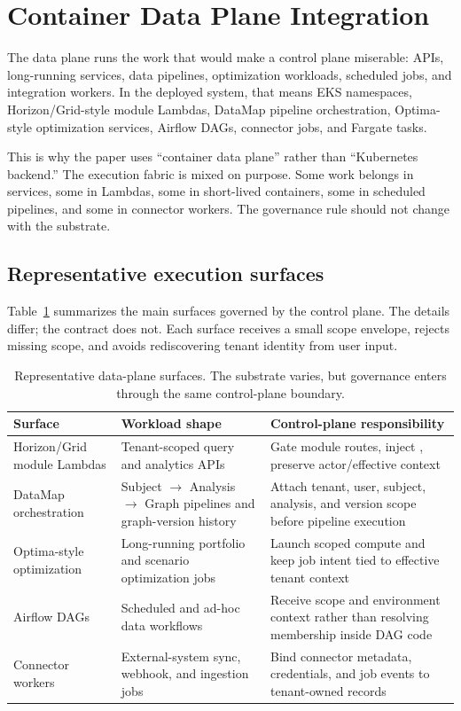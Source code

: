 \section{Container Data Plane Integration}
\label{sec:data-plane}

The data plane runs the work that would make a control plane miserable: APIs, long-running services, data pipelines, optimization workloads, scheduled jobs, and integration workers. In the deployed system, that means EKS namespaces, Horizon/Grid-style module Lambdas, DataMap pipeline orchestration, Optima-style optimization services, Airflow DAGs, connector jobs, and Fargate tasks.

This is why the paper uses ``container data plane'' rather than ``Kubernetes backend.'' The execution fabric is mixed on purpose. Some work belongs in services, some in Lambdas, some in short-lived containers, some in scheduled pipelines, and some in connector workers. The governance rule should not change with the substrate.

\subsection{Representative execution surfaces}

Table~\ref{tab:execution_surfaces} summarizes the main surfaces governed by the control plane. The details differ; the contract does not. Each surface receives a small scope envelope, rejects missing scope, and avoids rediscovering tenant identity from user input.

\begin{table}[H]
  \centering
  \scriptsize
  \begin{tabularx}{0.94\textwidth}{p{} p{} X}
    \toprule
    \textbf{Surface} & \textbf{Workload shape} & \textbf{Control-plane responsibility} \\
    \midrule
    Horizon/Grid module Lambdas & Tenant-scoped query and analytics APIs & Gate module routes, inject \scopeprefix{}, preserve actor/effective context \\
    DataMap orchestration & Subject $\rightarrow$ Analysis $\rightarrow$ Graph pipelines and graph-version history & Attach tenant, user, subject, analysis, and version scope before pipeline execution \\
    Optima-style optimization & Long-running portfolio and scenario optimization jobs & Launch scoped compute and keep job intent tied to effective tenant context \\
    Airflow DAGs & Scheduled and ad-hoc data workflows & Receive scope and environment context rather than resolving membership inside DAG code \\
    Connector workers & External-system sync, webhook, and ingestion jobs & Bind connector metadata, credentials, and job events to tenant-owned records \\
    \bottomrule
  \end{tabularx}
  \caption{Representative data-plane surfaces. The substrate varies, but governance enters through the same control-plane boundary.}
  \label{tab:execution_surfaces}
\end{table}

